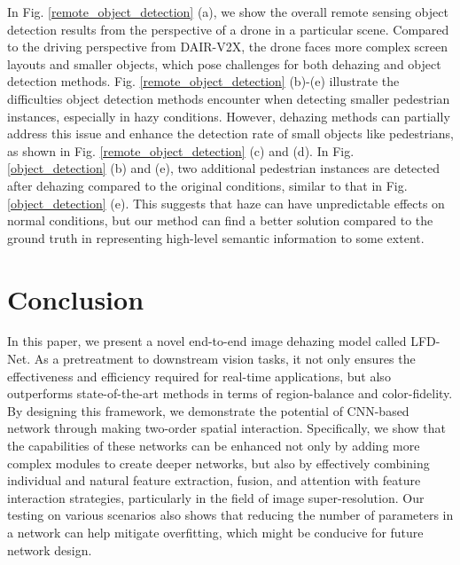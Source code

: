 \documentclass[lettersize,journal]{IEEEtran}
\begin{document}
In Fig. \ref{remote_object_detection} (a), we show the overall remote sensing object detection results from the perspective of a drone in a particular scene. Compared to the driving perspective from DAIR-V2X, the drone faces more complex screen layouts and smaller objects, which pose challenges for both dehazing and object detection methods. Fig. \ref{remote_object_detection} (b)-(e) illustrate the difficulties object detection methods encounter when detecting smaller pedestrian instances, especially in hazy conditions. However, dehazing methods can partially address this issue and enhance the detection rate of small objects like pedestrians, as shown in Fig. \ref{remote_object_detection} (c) and (d). In Fig. \ref{object_detection} (b) and (e), two additional pedestrian instances are detected after dehazing compared to the original conditions, similar to that in Fig. \ref{object_detection} (e). This suggests that haze can have unpredictable effects on normal conditions, but our method can find a better solution compared to the ground truth in representing high-level semantic information to some extent.


\section{Conclusion}
In this paper, we present a novel end-to-end image dehazing model called LFD-Net. As a pretreatment to downstream vision tasks, it not only ensures the effectiveness and efficiency required for real-time applications, but also outperforms state-of-the-art methods in terms of region-balance and color-fidelity. By designing this framework, we demonstrate the potential of CNN-based network through making two-order spatial interaction. Specifically, we show that the capabilities of these networks can be enhanced not only by adding more complex modules to create deeper networks, but also by effectively combining individual and natural feature extraction, fusion, and attention with feature interaction strategies, particularly in the field of image super-resolution. Our testing on various scenarios also shows that reducing the number of parameters in a network can help mitigate overfitting, which might be conducive for future network design.
\end{document}
